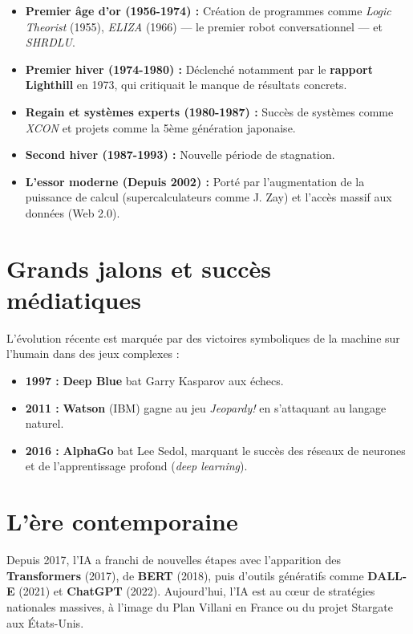 \documentclass[12pt,a4paper]{article}
\begin{document}
\begin{itemize}
    \item \textbf{Premier âge d'or (1956-1974) :} Création de programmes comme \textit{Logic Theorist} (1955), \textit{ELIZA} (1966) — le premier robot conversationnel — et \textit{SHRDLU}.
    \item \textbf{Premier hiver (1974-1980) :} Déclenché notamment par le \textbf{rapport Lighthill} en 1973, qui critiquait le manque de résultats concrets.
    \item \textbf{Regain et systèmes experts (1980-1987) :} Succès de systèmes comme \textit{XCON} et projets comme la 5ème génération japonaise.
    \item \textbf{Second hiver (1987-1993) :} Nouvelle période de stagnation.
    \item \textbf{L'essor moderne (Depuis 2002) :} Porté par l'augmentation de la puissance de calcul (supercalculateurs comme J. Zay) et l'accès massif aux données (Web 2.0).
\end{itemize}

\section{Grands jalons et succès médiatiques}

L'évolution récente est marquée par des victoires symboliques de la machine sur l'humain dans des jeux complexes :

\begin{itemize}
    \item \textbf{1997 :} \textbf{Deep Blue} bat Garry Kasparov aux échecs.
    \item \textbf{2011 :} \textbf{Watson} (IBM) gagne au jeu \textit{Jeopardy!} en s'attaquant au langage naturel.
    \item \textbf{2016 :} \textbf{AlphaGo} bat Lee Sedol, marquant le succès des réseaux de neurones et de l'apprentissage profond (\textit{deep learning}).
\end{itemize}

\section{L'ère contemporaine}

Depuis 2017, l'IA a franchi de nouvelles étapes avec l'apparition des \textbf{Transformers} (2017), de \textbf{BERT} (2018), puis d'outils génératifs comme \textbf{DALL-E} (2021) et \textbf{ChatGPT} (2022). Aujourd'hui, l'IA est au cœur de stratégies nationales massives, à l'image du Plan Villani en France ou du projet Stargate aux États-Unis.
\end{document}
